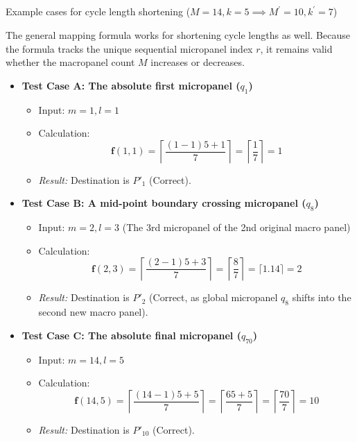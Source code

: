 \documentclass[
  number]{elsarticle}
\makeatletter
\let\oldsubparagraph\subparagraph
\renewcommand{\subparagraph}{
    \@ifstar
      \xxxSubParagraphStar
      \xxxSubParagraphNoStar
  }
\newcommand{\xxxSubParagraphStar}[1]{\oldsubparagraph*{#1}\mbox{}}
\newcommand{\xxxSubParagraphNoStar}[1]{\oldsubparagraph{#1}\mbox{}}
\providecommand{\tightlist}{%
  \setlength{\itemsep}{0pt}\setlength{\parskip}{0pt}}
\makeatother
\begin{document}
\subparagraph{\texorpdfstring{Example cases for cycle length shortening
(\(M=14, k=5 \implies M^\prime=10, k^\prime=7\))}{Example cases for cycle length shortening (M=14, k=5 \textbackslash implies M\^{}\textbackslash prime=10, k\^{}\textbackslash prime=7)}}\label{example-cases-for-cycle-length-shortening-m14-k5-implies-mprime10-kprime7}

The general mapping formula works for shortening cycle lengths as well.
Because the formula tracks the unique sequential micropanel index \(r\),
it remains valid whether the macropanel count \(M\) increases or
decreases.

\begin{itemize}
\tightlist
\item
  \textbf{Test Case A: The absolute first micropanel (\(q_1\))}

  \begin{itemize}
  \tightlist
  \item
    Input: \(m = 1, l = 1\)
  \item
    Calculation:
    \[\mathbf{f}(1, 1) = \left\lceil \frac{(1 - 1)5 + 1}{7} \right\rceil = \left\lceil \frac{1}{7} \right\rceil = 1\]
  \item
    \emph{Result:} Destination is \textbf{\(P'_1\)} (Correct).
  \end{itemize}
\item
  \textbf{Test Case B: A mid-point boundary crossing micropanel
  (\(q_8\))}

  \begin{itemize}
  \tightlist
  \item
    Input: \(m = 2, l = 3\) (The 3rd micropanel of the 2nd original
    macro panel)
  \item
    Calculation:
    \[\mathbf{f}(2, 3) = \left\lceil \frac{(2 - 1)5 + 3}{7} \right\rceil = \left\lceil \frac{8}{7} \right\rceil = \lceil 1.14 \rceil = 2\]
  \item
    \emph{Result:} Destination is \textbf{\(P'_2\)} (Correct, as global
    micropanel \(q_8\) shifts into the second new macro panel).
  \end{itemize}
\item
  \textbf{Test Case C: The absolute final micropanel (\(q_{70}\))}

  \begin{itemize}
  \tightlist
  \item
    Input: \(m = 14, l = 5\)
  \item
    Calculation:
    \[\mathbf{f}(14, 5) = \left\lceil \frac{(14 - 1)5 + 5}{7} \right\rceil = \left\lceil \frac{65 + 5}{7} \right\rceil = \left\lceil \frac{70}{7} \right\rceil = 10\]
  \item
    \emph{Result:} Destination is \textbf{\(P'_{10}\)} (Correct).
  \end{itemize}
\end{itemize}
\end{document}

